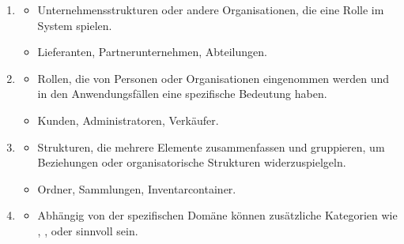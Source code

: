 \begin{infoBox}[title=Kategorien konzeptioneller Klassen]
\begin{enumerate}
        \begin{itemize}
            \item Einzelne Einträge innerhalb einer größeren Transaktion, die oft wiederholt oder in Kombination vorkommen.
            \item {} Rechnungsposten, Produktpositionen in einer Bestellung.
        \end{itemize}
        \item {}
        \begin{itemize}
            \item Unternehmensstrukturen oder andere Organisationen, die eine Rolle im System spielen.
            \item {} Lieferanten, Partnerunternehmen, Abteilungen.
        \end{itemize}
        \item {}
        \begin{itemize}
            \item Rollen, die von Personen oder Organisationen eingenommen werden und in den Anwendungsfällen eine spezifische Bedeutung haben.
            \item {} Kunden, Administratoren, Verkäufer.
        \end{itemize}
        \item {}
        \begin{itemize}
            \item Strukturen, die mehrere Elemente zusammenfassen und gruppieren, um Beziehungen oder organisatorische Strukturen widerzuspielgeln.
            \item {} Ordner, Sammlungen, Inventarcontainer.
        \end{itemize}
        \item {}
        \begin{itemize}
            \item Abhängig von der spezifischen Domäne können zusätzliche Kategorien wie , , oder  sinnvoll sein.
        \end{itemize}
    \end{enumerate}
\end{infoBox}


